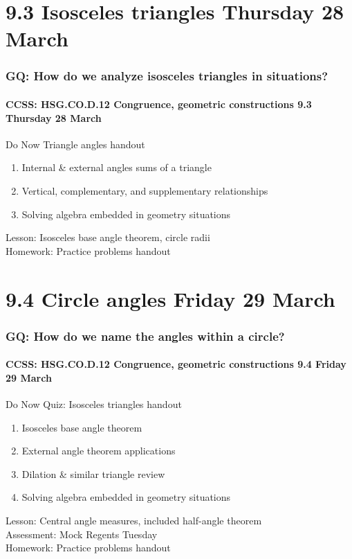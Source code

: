\documentclass{beamer}
\begin{document}
\section{9.3 Isosceles triangles Thursday 28 March}
  \frame
  {
    \frametitle{GQ: How do we analyze isosceles triangles in situations?}
    \framesubtitle{CCSS: HSG.CO.D.12 Congruence, geometric constructions \hfill \alert{9.3 Thursday 28 March}}

      \begin{block}{Do Now Triangle angles handout}
        \begin{enumerate}
          \item Internal \& external angles sums of a triangle
          \item Vertical, complementary, and supplementary relationships
          \item Solving algebra embedded in geometry situations
        \end{enumerate}
      \end{block}
    Lesson: Isosceles base angle theorem, circle radii\\
    Homework: Practice problems handout
  }

\section{9.4 Circle angles Friday 29 March}
  \frame
  {
    \frametitle{GQ: How do we name the angles within a circle?}
    \framesubtitle{CCSS: HSG.CO.D.12 Congruence, geometric constructions \hfill \alert{9.4 Friday 29 March}}

      \begin{block}{Do Now Quiz: Isosceles triangles handout}
        \begin{enumerate}
          \item Isosceles base angle theorem
          \item External angle theorem applications
          \item Dilation \& similar triangle review
          \item Solving algebra embedded in geometry situations
        \end{enumerate}
      \end{block}
    Lesson: Central angle measures, included half-angle theorem\\
    Assessment: \alert{Mock Regents Tuesday}\\
    Homework: Practice problems handout
  }
\end{document}
